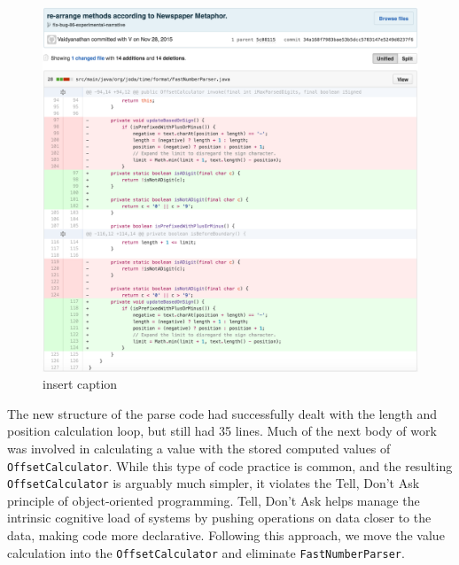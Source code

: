 \begin{figure}[H]
	\centering
	\includegraphics[width=\linewidth]{code21}
	\caption{insert caption}
\end{figure}

The new structure of the parse code had successfully dealt with the length and position calculation loop, but still had 35 lines. Much of the next body of work was involved in calculating a value with the stored computed values of \texttt{OffsetCalculator}. While this type of code practice is common, and the resulting \texttt{OffsetCalculator} is arguably much simpler, it violates the Tell, Don’t Ask principle of object-oriented programming. Tell, Don’t Ask helps manage the intrinsic cognitive load of systems by pushing operations on data closer to the data, making code more declarative. Following this approach, we move the value calculation into the \texttt{OffsetCalculator} and eliminate \texttt{FastNumberParser}.

